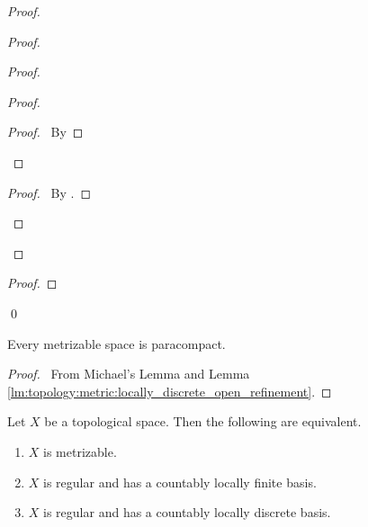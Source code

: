 \begin{proof}
\begin{proof}
\begin{proof}
\begin{proof}
        \qedstep
        \begin{proof}
          \pf\ By 
        \end{proof}
      \end{proof}
      \qedstep
      \begin{proof}
        \pf\ By .
      \end{proof}
    \end{proof}
  \end{proof}
  \begin{proof}
  \end{proof}
  \qed
\end{proof}

\begin{thm}
  \label{thm:topoology:metric:paracompact}
  Every metrizable space is paracompact.
\end{thm}

\begin{proof}
  \pf\ From Michael's Lemma and Lemma \ref{lm:topology:metric:locally_discrete_open_refinement}.
\end{proof}

\begin{thm}
  Let $X$ be a topological space. Then the following are equivalent.
  \begin{enumerate}
    \item $X$ is metrizable.
    \item $X$ is regular and has a countably locally finite basis.
    \item $X$ is regular and has a countably locally discrete basis.
  \end{enumerate}
\end{thm}

